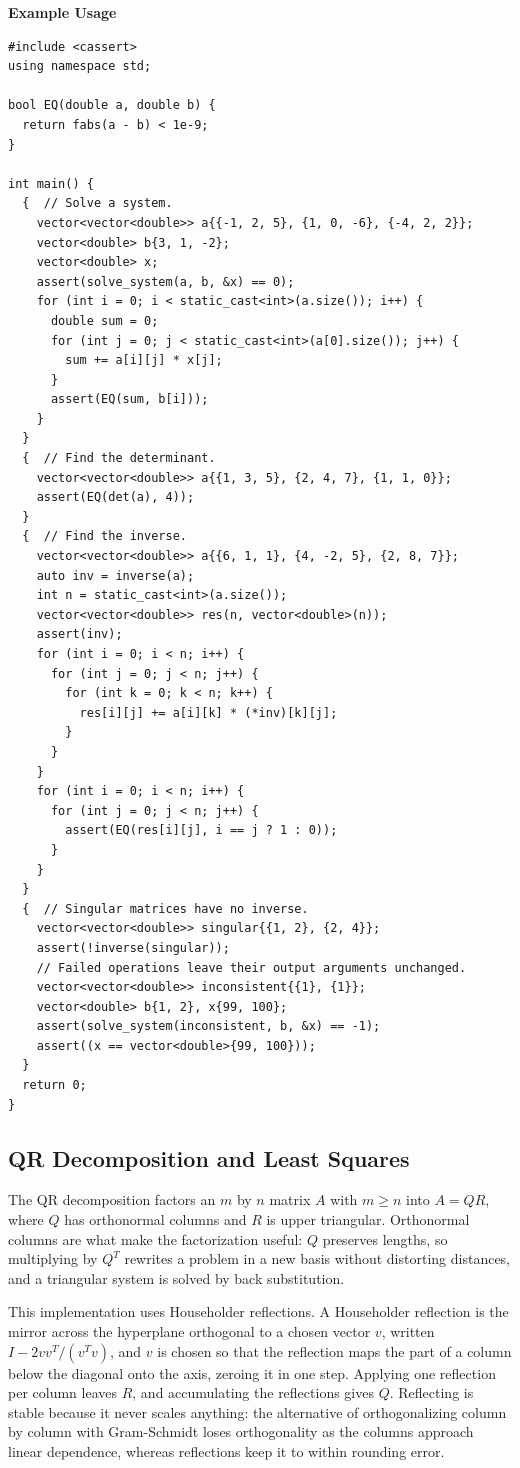 \textbf{Example Usage}\par
\begin{lstlisting}[style=cpp]
#include <cassert>
using namespace std;

bool EQ(double a, double b) {
  return fabs(a - b) < 1e-9;
}

int main() {
  {  // Solve a system.
    vector<vector<double>> a{{-1, 2, 5}, {1, 0, -6}, {-4, 2, 2}};
    vector<double> b{3, 1, -2};
    vector<double> x;
    assert(solve_system(a, b, &x) == 0);
    for (int i = 0; i < static_cast<int>(a.size()); i++) {
      double sum = 0;
      for (int j = 0; j < static_cast<int>(a[0].size()); j++) {
        sum += a[i][j] * x[j];
      }
      assert(EQ(sum, b[i]));
    }
  }
  {  // Find the determinant.
    vector<vector<double>> a{{1, 3, 5}, {2, 4, 7}, {1, 1, 0}};
    assert(EQ(det(a), 4));
  }
  {  // Find the inverse.
    vector<vector<double>> a{{6, 1, 1}, {4, -2, 5}, {2, 8, 7}};
    auto inv = inverse(a);
    int n = static_cast<int>(a.size());
    vector<vector<double>> res(n, vector<double>(n));
    assert(inv);
    for (int i = 0; i < n; i++) {
      for (int j = 0; j < n; j++) {
        for (int k = 0; k < n; k++) {
          res[i][j] += a[i][k] * (*inv)[k][j];
        }
      }
    }
    for (int i = 0; i < n; i++) {
      for (int j = 0; j < n; j++) {
        assert(EQ(res[i][j], i == j ? 1 : 0));
      }
    }
  }
  {  // Singular matrices have no inverse.
    vector<vector<double>> singular{{1, 2}, {2, 4}};
    assert(!inverse(singular));
    // Failed operations leave their output arguments unchanged.
    vector<vector<double>> inconsistent{{1}, {1}};
    vector<double> b{1, 2}, x{99, 100};
    assert(solve_system(inconsistent, b, &x) == -1);
    assert((x == vector<double>{99, 100}));
  }
  return 0;
}
\end{lstlisting}
\subsection{QR Decomposition and Least Squares}
\label{sec:6.5.5}
The QR decomposition factors an $m$ by $n$ matrix $A$ with $m \geq n$ into $A = QR$, where $Q$ has orthonormal columns and $R$ is upper triangular. Orthonormal columns are what make the factorization useful: $Q$ preserves lengths, so multiplying by $Q^T$ rewrites a problem in a new basis without distorting distances, and a triangular system is solved by back substitution.

This implementation uses Householder reflections. A Householder reflection is the mirror across the hyperplane orthogonal to a chosen vector $v$, written $I - 2vv^T/(v^Tv)$, and $v$ is chosen so that the reflection maps the part of a column below the diagonal onto the axis, zeroing it in one step. Applying one reflection per column leaves $R$, and accumulating the reflections gives $Q$. Reflecting is stable because it never scales anything: the alternative of orthogonalizing column by column with Gram-Schmidt loses orthogonality as the columns approach linear dependence, whereas reflections keep it to within rounding error.

